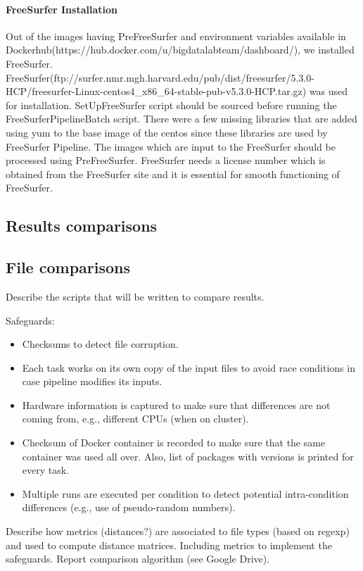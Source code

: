 \documentclass{article}
\begin{document}
\paragraph{FreeSurfer Installation}
Out of the images having PreFreeSurfer and environment variables available in Dockerhub(https://hub.docker.com/u/bigdatalabteam/dashboard/), we installed FreeSurfer. FreeSurfer(ftp://surfer.nmr.mgh.harvard.edu/pub/dist/freesurfer/5.3.0-HCP/freesurfer-Linux-centos4\_x86\_64-stable-pub-v5.3.0-HCP.tar.gz) was used for installation. SetUpFreeSurfer script should be sourced before running the FreeSurferPipelineBatch script. There were a few missing libraries that are added using yum to the base image of the centos since these libraries are used by FreeSurfer Pipeline. The images which are input to the FreeSurfer should be processed using PreFreeSurfer. FreeSurfer needs a license number which is obtained from the FreeSurfer site and it is essential for smooth functioning of FreeSurfer. 

\subsection{Results comparisons}
\subsection{File comparisons}

Describe the scripts that will be written to compare results.

Safeguards:
\begin{itemize}
\item Checksums to detect file corruption.
\item Each task works on its own copy of the input files to avoid race conditions in case pipeline modifies its inputs.
\item Hardware information is captured to make sure that differences are not coming from, e.g., different CPUs (when on cluster).
\item Checksum of Docker container is recorded to make sure that the same container was used all over. Also, list of packages with versions is printed for every task. 
\item Multiple runs are executed per condition to detect potential intra-condition differences (e.g., use of pseudo-random numbers).
\end{itemize}

Describe how metrics (distances?) are associated to file types (based on regexp) and used to compute distance matrices. Including metrics to implement the safeguards. Report comparison algorithm (see Google Drive).
\end{document}
